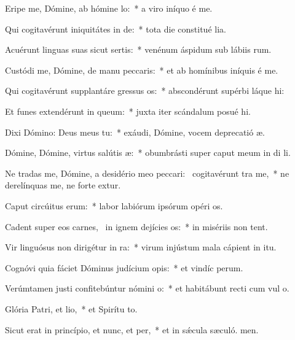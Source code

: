 \item Eripe me, Dómine, ab hómine lo:~* a viro iníquo é me.
\item Qui cogitavérunt iniquitátes in de:~* tota die constitué lia.
\item Acuérunt linguas suas sicut sertis:~* venénum áspidum sub lábiis rum.
\item Custódi me, Dómine, de manu peccaris:~* et ab homínibus iníquis é me.
\item Qui cogitavérunt supplantáre gressus os:~* abscondérunt supérbi láque hi:
\item Et funes extendérunt in queum:~* juxta iter scándalum posué hi.
\item Dixi Dómino: Deus meus  tu:~* exáudi, Dómine, vocem deprecatió æ.
\item Dómine, Dómine, virtus salútis æ:~* obumbrásti super caput meum in di li.
\item Ne tradas me, Dómine, a desidério meo peccari:~\pscross{} cogitavérunt tra me,~* ne derelínquas me, ne forte extur.
\item Caput circúitus erum:~* labor labiórum ipsórum opéri os.
\item Cadent super eos carnes,~\pscross{} in ignem dejícies os:~* in misériis non tent.
\item Vir linguósus non dirigétur in ra:~* virum injústum mala cápient in itu.
\item Cognóvi quia fáciet Dóminus judícium opis:~* et vindíc perum.
\item Verúmtamen justi confitebúntur nómini o:~* et habitábunt recti cum vul o.
\item Glória Patri, et lio,~* et Spirítu to.
\item Sicut erat in princípio, et nunc, et per,~* et in sǽcula sæculó. men.
